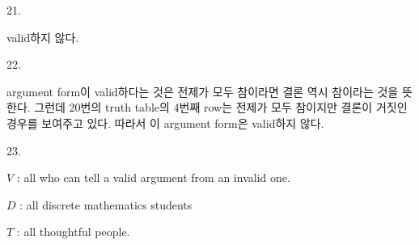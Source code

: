 \documentclass{article}
\begin{document}
21.
\begin{addmargin}[1em]{2em}
valid하지 않다.

\end{addmargin}
\bigskip

22.
\begin{addmargin}[1em]{2em}
argument form이 valid하다는 것은 전제가 모두 참이라면 결론 역시 참이라는 것을 뜻한다. 그런데 20번의 truth table의 4번째 row는 전제가 모두 참이지만 결론이 거짓인 경우를 보여주고 있다. 따라서 이 argument form은 valid하지 않다.

\end{addmargin}
\bigskip

23.
\begin{addmargin}[1em]{2em}
\(V\) : all who can tell a valid argument from an invalid one.

\(D\) : all discrete mathematics students

\(T\) : all thoughtful people.

\def\firstcircle{(0,0) circle (3cm)}
\def\secondcircle{(0:0.5cm) circle (1.5cm)}

\bigskip



\end{addmargin}
\bigskip
\end{document}
